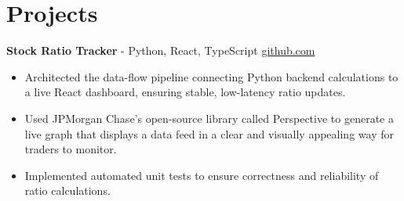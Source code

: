 \documentclass[11pt]{article}       %
\begin{document}
\vspace{-18.5pt}

\section*{Projects}

\textbf{Stock Ratio Tracker}{ - Python, React, TypeScript} \hfill \href{https://github.com/Monica20030707/Trading-Dashboard_UI}{github.com} \\
\vspace{-9pt}
\begin{itemize}
  \item Architected the data-flow pipeline connecting Python backend calculations to a live React dashboard, ensuring stable, low-latency ratio updates.
  \item Used JPMorgan Chase's open-source library called Perspective to generate a live graph that displays a data feed in a clear and visually appealing way for traders to monitor.
  \item Implemented automated unit tests to ensure correctness and reliability of ratio calculations.
\end{itemize}

\end{document}
